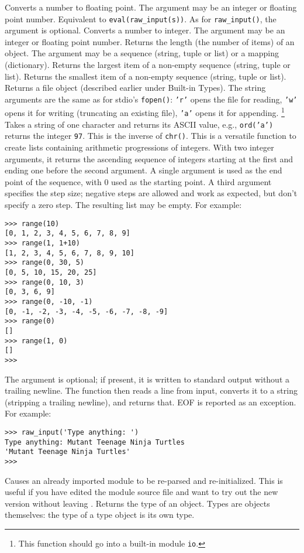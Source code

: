 \begin{description}
Converts a number to floating point.
The argument may be an integer or floating point number.
Equivalent to
{\tt eval(raw\_input(s))}.
As for
{\tt raw\_input()},
the argument is optional.
Converts a number to integer.
The argument may be an integer or floating point number.
Returns the length (the number of items) of an object.
The argument may be a sequence (string, tuple or list) or a mapping
(dictionary).
Returns the largest item of a non-empty sequence (string, tuple or list).
Returns the smallest item of a non-empty sequence (string, tuple or list).
Returns a file object (described earlier under Built-in Types).
The string arguments are the same as for stdio's
{\tt fopen()}:
{\tt 'r'}
opens the file for reading,
{\tt 'w'}
opens it for writing (truncating an existing file),
{\tt 'a'}
opens it for appending.%
\footnote{
This function should go into a built-in module
{\tt io}.
}
Takes a string of one character and returns its
ASCII value, e.g., {\tt ord('a')} returns the integer {\tt 97}.
This is the inverse of {\tt chr()}.
This is a versatile function to create lists containing arithmetic
progressions of integers.
With two integer arguments, it returns the ascending sequence of
integers starting at the first and ending one before the second
argument.
A single argument is used as the end point of the sequence, with 0 used
as the starting point.
A third argument specifies the step size; negative steps are allowed and
work as expected, but don't specify a zero step.
The resulting list may be empty.
For example:
\bcode\begin{verbatim}
>>> range(10)
[0, 1, 2, 3, 4, 5, 6, 7, 8, 9]
>>> range(1, 1+10)
[1, 2, 3, 4, 5, 6, 7, 8, 9, 10]
>>> range(0, 30, 5)
[0, 5, 10, 15, 20, 25]
>>> range(0, 10, 3)
[0, 3, 6, 9]
>>> range(0, -10, -1)
[0, -1, -2, -3, -4, -5, -6, -7, -8, -9]
>>> range(0)
[]
>>> range(1, 0)
[]
>>> 
\end{verbatim}\ecode
{}
The argument is optional; if present, it is written to standard output
without a trailing newline.
The function then reads a line from input, converts it to a string
(stripping a trailing newline), and returns that.
EOF is reported as an exception.
For example:
\bcode\begin{verbatim}
>>> raw_input('Type anything: ')
Type anything: Mutant Teenage Ninja Turtles
'Mutant Teenage Ninja Turtles'
>>> 
\end{verbatim}\ecode
{}
Causes an already imported module to be re-parsed and re-initialized.
This is useful if you have edited the module source file and want to
try out the new version without leaving {\Python}.
Returns the type of an object.
Types are objects themselves:
the type of a type object is its own type.
\end{description}

